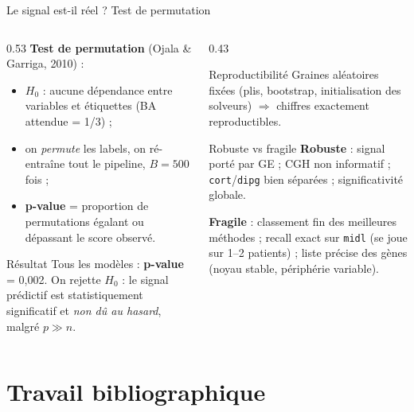 \documentclass[aspectratio=169, 10pt]{beamer}
\begin{document}
\begin{frame}{Le signal est-il réel ? Test de permutation}
  \vspace{14pt}
  \begin{columns}[T]
    \begin{column}{0.53\textwidth}
      \textbf{Test de permutation} (Ojala \& Garriga, 2010) :
      \begin{itemize}
        \item $H_0$ : aucune dépendance entre variables et étiquettes (BA attendue = 1/3) ;
        \item on \textit{permute} les labels, on ré-entraîne tout le pipeline, $B = 500$ fois ;
        \item \textbf{p-value} = proportion de permutations égalant ou dépassant le score observé.
      \end{itemize}

      \medskip
      \begin{block}{Résultat}
        Tous les modèles : \textbf{p-value} = 0,002. On rejette $H_0$ : le signal prédictif est statistiquement significatif et \textit{non dû au hasard}, malgré $p \gg n$.
      \end{block}
    \end{column}

    \begin{column}{0.43\textwidth}
      \begin{exampleblock}{Reproductibilité}
        Graines aléatoires fixées (plis, bootstrap, initialisation des solveurs) $\Rightarrow$ chiffres exactement reproductibles.
      \end{exampleblock}

      \begin{alertblock}{Robuste vs fragile}
        \textbf{Robuste} : signal porté par GE ; CGH non informatif ; \texttt{cort}/\texttt{dipg} bien séparées ; significativité globale.

        \medskip
        \textbf{Fragile} : classement fin des meilleures méthodes ; recall exact sur \texttt{midl} (se joue sur 1–2 patients) ; liste précise des gènes (noyau stable, périphérie variable).
      \end{alertblock}
    \end{column}
  \end{columns}
\end{frame}

\section{Travail bibliographique}
\end{document}
